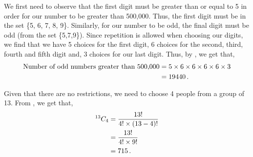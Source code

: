 %
%


\begin{subquestions}
	
\subquestion

We first need to observe that the first digit must be greater than or equal to 5 in order for our number to be greater than 500,000. Thus, the first digit must be in the set \{5, 6, 7, 8, 9\}. Similarly, for our number to be odd, the final digit must be odd (from the set \{5,7,9\}). Since repetition is allowed when choosing our digits, we find that we have 5 choices for the first digit, 6 choices for the second, third, fourth and fifth digit and, 3 choices for our last digit. Thus, by , we get that,
\begin{align}
	\text{Number of odd numbers greater than 500,000} & = 5 \times 6 \times 6 \times 6 \times 6 \times 3 \nonumber \\
	                                                  & = 19440 \,.
\end{align}


\subquestion

\begin{subsubquestions}
	
\subsubquestion

Given that there are no restrictions, we need to choose 4 people from a group of 13. From , we get that,
\begin{align}
	^{13}C_4 & = \frac{13!}{4! \times (13-4)!} \nonumber \\
	         & = \frac{13!}{4! \times 9!} \nonumber \\
	         & = 715 \,.
\end{align}
	

\end{subsubquestions}
\end{subquestions}
